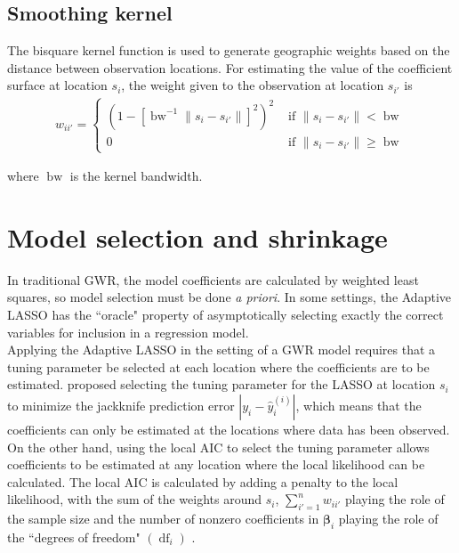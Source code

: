 \documentclass[authoryear, review, 11pt]{elsarticle}
\DeclareMathOperator*{\bw}{\mbox{bw}}
\DeclareMathOperator*{\df}{\mbox{df}}
\begin{document}
	 
	 \subsection{Smoothing kernel}
	 	The bisquare kernel function is used to generate geographic weights based on the distance between observation locations. For estimating the value of the coefficient surface at location $s_i$, the weight given to the observation at location $s_{i'}$ is	
	\begin{eqnarray}
		w_{ii'} = \begin{cases} \left( 1-\left[ \bw^{-1} \|s_i-s_{i'}\| \right]^2 \right)^2 & \mbox{ if } \|s_i-s_{i'}\| < \bw \\ 0 & \mbox{ if } \|s_i-s_{i'}\| \geq \bw \end{cases}
	\end{eqnarray}
	
	where $\bw$ is the kernel bandwidth.\\
	
\section{Model selection and shrinkage \label{section:method}}
	In traditional GWR, the model coefficients are calculated by weighted least squares, so model selection must be done \emph{a priori}. In some settings, the Adaptive LASSO \citep{Zou:2006} has the ``oracle" property of asymptotically selecting exactly the correct variables for inclusion in a regression model.\\

	Applying the Adaptive LASSO in the setting of a GWR model requires that a tuning parameter be selected at each location where the coefficients are to be estimated. \cite{Wheeler:2009} proposed selecting the tuning parameter for the LASSO at location $s_i$ to minimize the jackknife prediction error $|y_i - \hat{y}_i^{(i)}|$, which means that the coefficients can only be estimated at the locations where data has been observed. On the other hand, using the local AIC to select the tuning parameter allows coefficients to be estimated at any location where the local likelihood can be calculated. The local AIC is calculated by adding a penalty to the local likelihood, with the sum of the weights around $s_i$, $\sum_{i'=1}^n w_{ii'}$ playing the role of the sample size and the number of nonzero coefficients in $\bm{\beta}_i$ playing the role of the ``degrees of freedom" $\left( \df_i \right)$ \citep{Zou:2007}.\\
\end{document}
